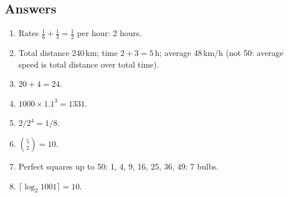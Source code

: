 \subsection*{Answers}
\begin{enumerate}
  \item Rates $\tfrac16 + \tfrac13 = \tfrac12$ per hour: 2 hours.
  \item Total distance 240\,km; time $2 + 3 = 5$\,h; average 48\,km/h (not 50: average speed is total distance over total time).
  \item $20 + 4 = 24$.
  \item $1000 \times 1.1^3 = 1331$.
  \item $2/2^4 = 1/8$.
  \item $\binom{5}{2} = 10$.
  \item Perfect squares up to 50: 1, 4, 9, 16, 25, 36, 49: 7 bulbs.
  \item $\lceil\log_2 1001\rceil = 10$.
\end{enumerate}
